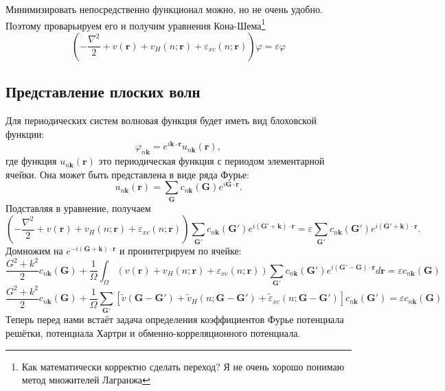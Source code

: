 \documentclass[11pt,russian]{ncc}
\newcommand{\eps}{\varepsilon}
\renewcommand{\phi}{\varphi}
\renewcommand{\vec}{\boldsymbol}
\begin{document}
    Минимизировать непосредственно функционал можно, но не очень удобно. Поэтому проварьируем его и получим уравнения Кона-Шема\footnote{Как математически корректно сделать переход? Я не очень хорошо понимаю метод множителей Лагранжа}
    \begin{equation}
        \left(-\frac{\nabla^2}{2} + v(\vec{r}) + v_H(n;\vec{r}) + \eps_{xc}(n;\vec{r})\right)\phi = \eps\phi
    \end{equation}

    \subsection{Представление плоских волн}
    Для периодических систем волновая функция будет иметь вид блоховской функции:
    \begin{equation}
        \phi_{n\vec{k}} = e^{i\vec{k}\cdot\vec{r}} u_{n\vec{k}}(\vec{r}),
    \end{equation}
    где функция \(u_{n\vec{k}}(\vec{r})\) это периодическая функция с периодом элементарной ячейки. Она может быть представлена в виде ряда Фурье:
    \begin{equation}
        u_{n\vec{k}}(\vec{r}) = \sum_{\vec{G}} c_{n\vec{k}}(\vec{G}) e^{i\vec{G}\cdot\vec{r}}.
    \end{equation}
    Подставляя в уравнение, получаем
    \begin{equation}
        \left(-\frac{\nabla^2}{2} + v(\vec{r}) + v_H(n;\vec{r}) + \eps_{xc}(n;\vec{r})\right)\sum_{\vec{G}'} c_{n\vec{k}}(\vec{G}') e^{i(\vec{G}' + \vec{k})\cdot\vec{r}} = \eps\sum_{\vec{G}'} c_{n\vec{k}}(\vec{G}') e^{i(\vec{G}' + \vec{k})\cdot\vec{r}}.
    \end{equation}
    Домножим на \( e^{-i(\vec{G}+\vec{k})\cdot\vec{r}} \) и проинтегрируем по ячейке:
    \begin{equation}
        \frac{G^2+k^2}{2}  c_{n\vec{k}}(\vec{G}) + \frac{1}{\Omega}\int_\Omega \left(v(\vec{r}) + v_H(n;\vec{r}) + \eps_{xc}(n;\vec{r})\right)\sum_{\vec{G}'} c_{n\vec{k}}(\vec{G}') e^{i(\vec{G}' - \vec{G})\cdot\vec{r}} d\vec{r} = \eps c_{n\vec{k}}(\vec{G})
    \end{equation}
    \begin{equation}
        \frac{G^2+k^2}{2}  c_{n\vec{k}}(\vec{G}) + \frac{1}{\Omega}\sum_{\vec{G}'}\left[\tilde{v}(\vec{G}-\vec{G}') + \tilde{v}_H(n;\vec{G} - \vec{G}') + \tilde{\eps}_{xc}(n;\vec{G} - \vec{G}')\right] c_{n\vec{k}}(\vec{G}') = \eps c_{n\vec{k}}(\vec{G})
    \end{equation}
    Теперь перед нами встаёт задача определения коэффициентов Фурье потенциала решётки, потенциала Хартри и обменно-корреляционного потенциала.
\end{document}
